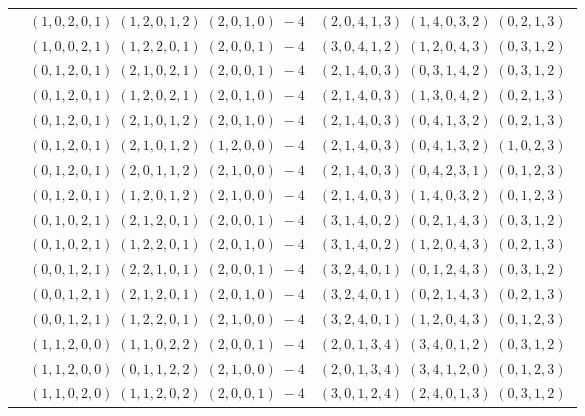\documentclass[11pt]{article}
\begin{document}
\begin{longtable}[l]{|c|c|c|}
 \cline{2-3} 
 & $(1 ,0 ,2 ,0 ,1) \;(1 ,2 ,0 ,1 ,2) \;(2 ,0 ,1 ,0) \;-4$ & $(2 ,0 ,4 ,1 ,3) \;(1 ,4 ,0 ,3 ,2) \;(0 ,2 ,1 ,3) \;$\\ 
 \cline{2-3} 
 & $(1 ,0 ,0 ,2 ,1) \;(1 ,2 ,2 ,0 ,1) \;(2 ,0 ,0 ,1) \;-4$ & $(3 ,0 ,4 ,1 ,2) \;(1 ,2 ,0 ,4 ,3) \;(0 ,3 ,1 ,2) \;$\\ 
 \cline{2-3} 
 & $(0 ,1 ,2 ,0 ,1) \;(2 ,1 ,0 ,2 ,1) \;(2 ,0 ,0 ,1) \;-4$ & $(2 ,1 ,4 ,0 ,3) \;(0 ,3 ,1 ,4 ,2) \;(0 ,3 ,1 ,2) \;$\\ 
 \cline{2-3} 
 & $(0 ,1 ,2 ,0 ,1) \;(1 ,2 ,0 ,2 ,1) \;(2 ,0 ,1 ,0) \;-4$ & $(2 ,1 ,4 ,0 ,3) \;(1 ,3 ,0 ,4 ,2) \;(0 ,2 ,1 ,3) \;$\\ 
 \cline{2-3} 
 & $(0 ,1 ,2 ,0 ,1) \;(2 ,1 ,0 ,1 ,2) \;(2 ,0 ,1 ,0) \;-4$ & $(2 ,1 ,4 ,0 ,3) \;(0 ,4 ,1 ,3 ,2) \;(0 ,2 ,1 ,3) \;$\\ 
 \cline{2-3} 
 & $(0 ,1 ,2 ,0 ,1) \;(2 ,1 ,0 ,1 ,2) \;(1 ,2 ,0 ,0) \;-4$ & $(2 ,1 ,4 ,0 ,3) \;(0 ,4 ,1 ,3 ,2) \;(1 ,0 ,2 ,3) \;$\\ 
 \cline{2-3} 
 & $(0 ,1 ,2 ,0 ,1) \;(2 ,0 ,1 ,1 ,2) \;(2 ,1 ,0 ,0) \;-4$ & $(2 ,1 ,4 ,0 ,3) \;(0 ,4 ,2 ,3 ,1) \;(0 ,1 ,2 ,3) \;$\\ 
 \cline{2-3} 
 & $(0 ,1 ,2 ,0 ,1) \;(1 ,2 ,0 ,1 ,2) \;(2 ,1 ,0 ,0) \;-4$ & $(2 ,1 ,4 ,0 ,3) \;(1 ,4 ,0 ,3 ,2) \;(0 ,1 ,2 ,3) \;$\\ 
 \cline{2-3} 
 & $(0 ,1 ,0 ,2 ,1) \;(2 ,1 ,2 ,0 ,1) \;(2 ,0 ,0 ,1) \;-4$ & $(3 ,1 ,4 ,0 ,2) \;(0 ,2 ,1 ,4 ,3) \;(0 ,3 ,1 ,2) \;$\\ 
 \cline{2-3} 
 & $(0 ,1 ,0 ,2 ,1) \;(1 ,2 ,2 ,0 ,1) \;(2 ,0 ,1 ,0) \;-4$ & $(3 ,1 ,4 ,0 ,2) \;(1 ,2 ,0 ,4 ,3) \;(0 ,2 ,1 ,3) \;$\\ 
 \cline{2-3} 
 & $(0 ,0 ,1 ,2 ,1) \;(2 ,2 ,1 ,0 ,1) \;(2 ,0 ,0 ,1) \;-4$ & $(3 ,2 ,4 ,0 ,1) \;(0 ,1 ,2 ,4 ,3) \;(0 ,3 ,1 ,2) \;$\\ 
 \cline{2-3} 
 & $(0 ,0 ,1 ,2 ,1) \;(2 ,1 ,2 ,0 ,1) \;(2 ,0 ,1 ,0) \;-4$ & $(3 ,2 ,4 ,0 ,1) \;(0 ,2 ,1 ,4 ,3) \;(0 ,2 ,1 ,3) \;$\\ 
 \cline{2-3} 
 & $(0 ,0 ,1 ,2 ,1) \;(1 ,2 ,2 ,0 ,1) \;(2 ,1 ,0 ,0) \;-4$ & $(3 ,2 ,4 ,0 ,1) \;(1 ,2 ,0 ,4 ,3) \;(0 ,1 ,2 ,3) \;$\\ 
 \cline{2-3} 
 & $(1 ,1 ,2 ,0 ,0) \;(1 ,1 ,0 ,2 ,2) \;(2 ,0 ,0 ,1) \;-4$ & $(2 ,0 ,1 ,3 ,4) \;(3 ,4 ,0 ,1 ,2) \;(0 ,3 ,1 ,2) \;$\\ 
 \cline{2-3} 
 & $(1 ,1 ,2 ,0 ,0) \;(0 ,1 ,1 ,2 ,2) \;(2 ,1 ,0 ,0) \;-4$ & $(2 ,0 ,1 ,3 ,4) \;(3 ,4 ,1 ,2 ,0) \;(0 ,1 ,2 ,3) \;$\\ 
 \cline{2-3} 
 & $(1 ,1 ,0 ,2 ,0) \;(1 ,1 ,2 ,0 ,2) \;(2 ,0 ,0 ,1) \;-4$ & $(3 ,0 ,1 ,2 ,4) \;(2 ,4 ,0 ,1 ,3) \;(0 ,3 ,1 ,2) \;$\\ 

\end{longtable}
\end{document}
